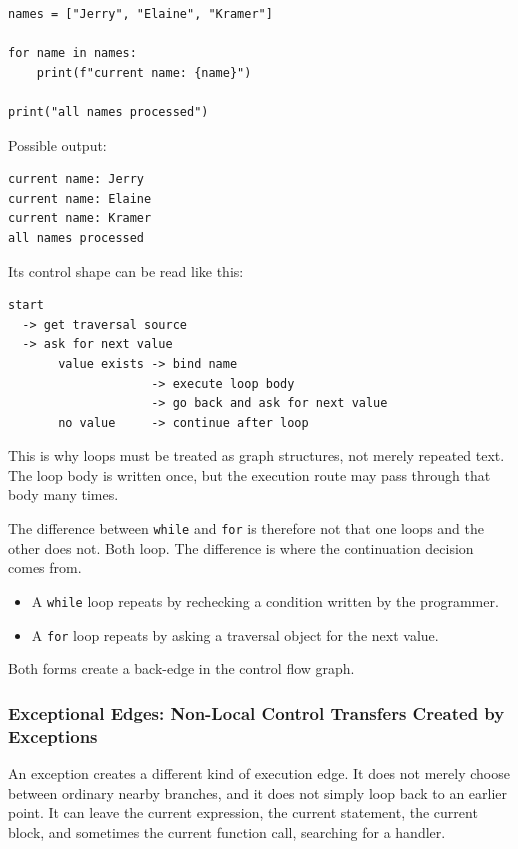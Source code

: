 \begin{verbatim}
names = ["Jerry", "Elaine", "Kramer"]

for name in names:
    print(f"current name: {name}")

print("all names processed")
\end{verbatim}

Possible output:

\begin{verbatim}
current name: Jerry
current name: Elaine
current name: Kramer
all names processed
\end{verbatim}

Its control shape can be read like this:

\begin{verbatim}
start
  -> get traversal source
  -> ask for next value
       value exists -> bind name
                    -> execute loop body
                    -> go back and ask for next value
       no value     -> continue after loop
\end{verbatim}

This is why loops must be treated as graph structures, not merely repeated text. The loop body is written once, but the execution route may pass through that body many times.

The difference between \texttt{while} and \texttt{for} is therefore not that one loops and the other does not. Both loop. The difference is where the continuation decision comes from.

\begin{itemize}
    \item A \texttt{while} loop repeats by rechecking a condition written by the programmer.
    \item A \texttt{for} loop repeats by asking a traversal object for the next value.
\end{itemize}

Both forms create a back-edge in the control flow graph.

\subsubsection{Exceptional Edges: Non-Local Control Transfers Created by Exceptions}

An exception creates a different kind of execution edge. It does not merely choose between ordinary nearby branches, and it does not simply loop back to an earlier point. It can leave the current expression, the current statement, the current block, and sometimes the current function call, searching for a handler.

